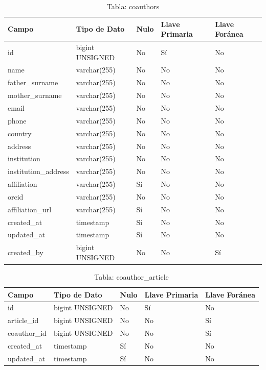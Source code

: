 \begin{table}[H]
    \centering
    \begin{tabular}{|p{5cm}|p{3cm}|p{1cm}|p{2cm}|p{2cm}|}
        \hline
        \textbf{Campo} & \textbf{Tipo de Dato} & \textbf{Nulo} & \textbf{Llave Primaria} & \textbf{Llave Foránea} \\
        \hline
        id & bigint UNSIGNED & No & Sí & No \\
        name & varchar(255) & No & No & No \\
        father\_surname & varchar(255) & No & No & No \\
        mother\_surname & varchar(255) & No & No & No \\
        email & varchar(255) & No & No & No \\
        phone & varchar(255) & No & No & No \\
        country & varchar(255) & No & No & No \\
        address & varchar(255) & No & No & No \\
        institution & varchar(255) & No & No & No \\
        institution\_address & varchar(255) & No & No & No \\
        affiliation & varchar(255) & Sí & No & No \\
        orcid & varchar(255) & No & No & No \\
        affiliation\_url & varchar(255) & Sí & No & No \\
        created\_at & timestamp & Sí & No & No \\
        updated\_at & timestamp & Sí & No & No \\
        created\_by & bigint UNSIGNED & No & No & Sí \\
        \hline
    \end{tabular}
    \caption{Tabla: coauthors}
    \label{tab:coauthors}

\end{table}

\begin{table}[H]
    \centering
    \begin{tabular}{|p{5cm}|p{3cm}|p{1cm}|p{2cm}|p{2cm}|}
        \hline
        \textbf{Campo} & \textbf{Tipo de Dato} & \textbf{Nulo} & \textbf{Llave Primaria} & \textbf{Llave Foránea} \\
        \hline
        id & bigint UNSIGNED & No & Sí & No \\
        article\_id & bigint UNSIGNED & No & No & Sí \\
        coauthor\_id & bigint UNSIGNED & No & No & Sí \\
        created\_at & timestamp & Sí & No & No \\
        updated\_at & timestamp & Sí & No & No \\
        \hline
    \end{tabular}
    \caption{Tabla: coauthor\_article}
    \label{tab:coauthor_article}

\end{table}

